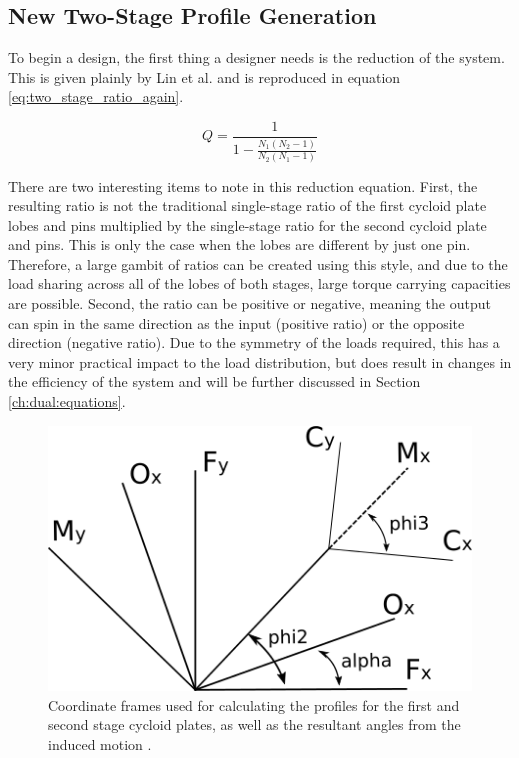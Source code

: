 \subsection{New Two-Stage Profile Generation} \label{ch:dual:initial_equation:profiles}

To begin a design, the first thing a designer needs is the reduction of the system. This is given plainly by Lin et al. and is reproduced in equation \ref{eq:two_stage_ratio_again}.

\begin{equation} \label{eq:two_stage_ratio_again}
Q = \frac{1}{1 - \frac{N_1 (N_2-1)}{N_2 (N_1-1)}}
\end{equation}

There are two interesting items to note in this reduction equation. First, the resulting ratio is not the traditional single-stage ratio of the first cycloid plate lobes and pins multiplied by the single-stage ratio for the second cycloid plate and pins. This is only the case when the lobes are different by just one pin. Therefore, a large gambit of ratios can be created using this style, and due to the load sharing across all of the lobes of both stages, large torque carrying capacities are possible. Second, the ratio can be positive or negative, meaning the output can spin in the same direction as the input (positive ratio) or the opposite direction (negative ratio). Due to the symmetry of the loads required, this has a very minor practical impact to the load distribution, but does result in changes in the efficiency of the system and will be further discussed in Section \ref{ch:dual:equations}. 

\begin{figure}[h]
	\centering
	\includegraphics[width=0.50\linewidth]{fig/two_stage_frames}
   \caption{Coordinate frames used for calculating the profiles for the first and second stage cycloid plates, as well as the resultant angles from the induced motion \textalpha.}
   \label{fig:two_stage_frame}
\end{figure}

